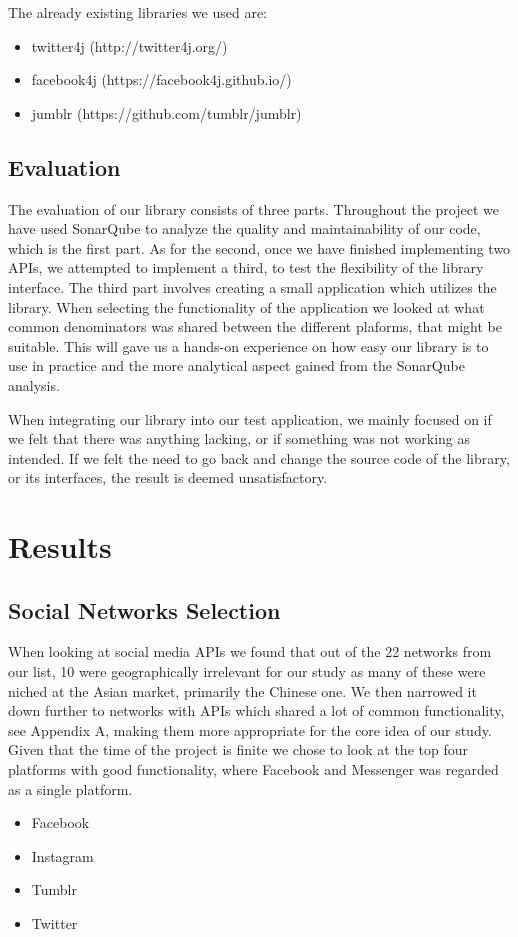 \documentclass{sigchi-alternate}
\begin{document}
The already existing libraries we used are:
\begin{itemize}
	\item twitter4j (http://twitter4j.org/)
	\item facebook4j (https://facebook4j.github.io/)
	\item jumblr (https://github.com/tumblr/jumblr)
\end{itemize}
\subsection{Evaluation}
The evaluation of our library consists of three parts. Throughout the project we have used SonarQube to analyze the quality and maintainability of our code, which is the first part. As for the second, once we have finished
implementing two APIs, we attempted to implement a third, to test the flexibility of the library interface. The third part involves creating a small application which utilizes the library. When selecting the functionality 
of the application we looked at what common denominators was shared between the different plaforms, that might be suitable. This will gave us a hands-on experience on how easy our library is to use in practice and the more 
analytical aspect gained from the SonarQube analysis.

When integrating our library into our test application, we mainly focused on if we felt that there was anything lacking, or if something was not working as intended. If we felt the need to go back and
change the source code of the library, or its interfaces, the result is deemed unsatisfactory. 

\section{Results}
\subsection{Social Networks Selection}
When looking at social media APIs we found that out of the 22 networks from our list\autocite{STATISTA_LEADING_SOCIAL_NETWORKS}, 10 were geographically irrelevant for our study as many of these were
niched at the Asian market, primarily the Chinese one. We then narrowed it down further to networks with APIs which shared a lot of common functionality, see Appendix A, making them more appropriate for the core idea
of our study. Given that the time of the project is finite we chose to look at the top four platforms with good functionality, where Facebook and Messenger was regarded as a single platform.
\begin{itemize}
	\item Facebook
	\item Instagram
	\item Tumblr
	\item Twitter
\end{itemize}
\end{document}
